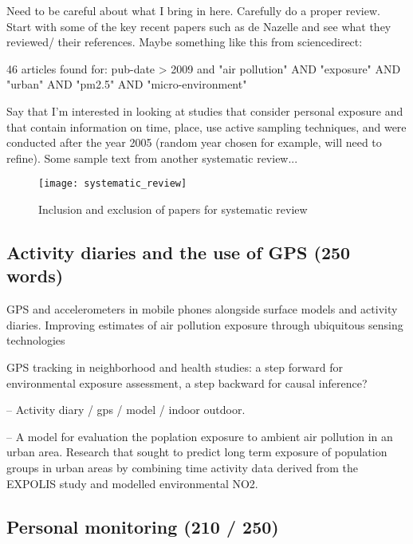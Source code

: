 Need to be careful about what I bring in here. Carefully do a proper review. Start with some of the key recent papers such as de Nazelle and see what they reviewed/ their references. Maybe something like this from sciencedirect:

46 articles found for: pub-date > 2009 and "air pollution" AND "exposure" AND "urban" AND "pm2.5" AND "micro-environment"

Say that I'm interested in looking at studies that consider personal exposure and that contain information on time, place, use active sampling techniques, and were conducted after the year 2005 (random year chosen for example, will need to refine). Some sample text from another systematic review...

\begin{figure}[H]
\centering
\texttt{[image: systematic\_review]}
\caption{Inclusion and exclusion of papers for systematic review}
\label{fig:systematic_review}
\end{figure}


\subsection{Activity diaries and the use of GPS (250 words)}
\label{subsec:avtivitydiaries}

\cite{DeNazelle2013}
GPS and accelerometers in mobile phones alongside surface models and activity diaries. Improving estimates of air pollution exposure through ubiquitous sensing technologies

\cite{Chaix2013} GPS tracking in neighborhood and health studies: a step forward for environmental exposure assessment, a step backward for causal inference?

\cite{Gerharz2013} -- Activity diary / gps / model / indoor outdoor. 

\cite{Kousa2002} --  A model for evaluation the poplation exposure to ambient air pollution in an urban area. Research that sought to predict long term exposure of population groups in urban areas by combining time activity data derived from the EXPOLIS study and modelled environmental NO2.


\subsection{Personal monitoring (210 / 250)}
\label{subsec:personalmonitoring}

